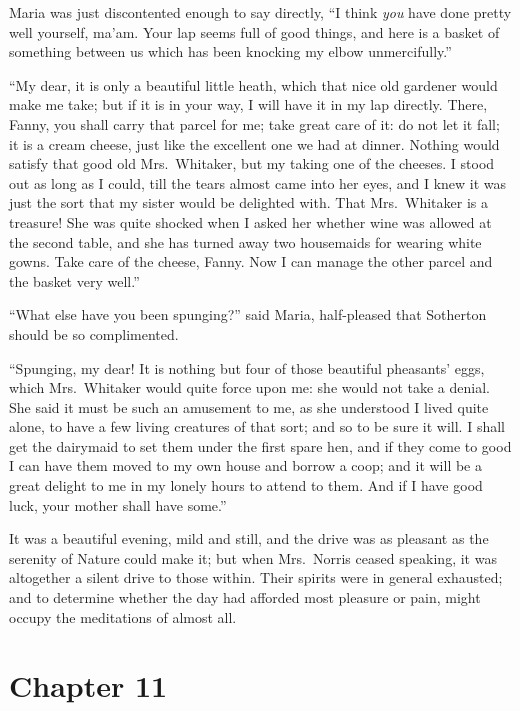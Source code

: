Maria was just discontented enough to say directly, ``I think
\emph{you} have done pretty well yourself, ma'am. Your lap seems
full of good things, and here is a basket of something
between us which has been knocking my elbow unmercifully.''

``My dear, it is only a beautiful little heath,
which that nice old gardener would make me take; but if
it is in your way, I will have it in my lap directly.
There, Fanny, you shall carry that parcel for me;
take great care of it:  do not let it fall; it is a
cream cheese, just like the excellent one we had at dinner.
Nothing would satisfy that good old Mrs.\ Whitaker,
but my taking one of the cheeses.  I stood out as long
as I could, till the tears almost came into her eyes,
and I knew it was just the sort that my sister would
be delighted with.  That Mrs.\ Whitaker is a treasure!
She was quite shocked when I asked her whether wine was allowed
at the second table, and she has turned away two housemaids
for wearing white gowns.  Take care of the cheese, Fanny.
Now I can manage the other parcel and the basket very well.''

``What else have you been spunging?'' said Maria,
half-pleased that Sotherton should be so complimented.

``Spunging, my dear!  It is nothing but four of those
beautiful pheasants' eggs, which Mrs.\ Whitaker would
quite force upon me:  she would not take a denial.
She said it must be such an amusement to me, as she
understood I lived quite alone, to have a few living
creatures of that sort; and so to be sure it will.
I shall get the dairymaid to set them under the first
spare hen, and if they come to good I can have them moved
to my own house and borrow a coop; and it will be a great
delight to me in my lonely hours to attend to them.
And if I have good luck, your mother shall have some.''

It was a beautiful evening, mild and still, and the
drive was as pleasant as the serenity of Nature
could make it; but when Mrs.\ Norris ceased speaking,
it was altogether a silent drive to those within.
Their spirits were in general exhausted; and to determine
whether the day had afforded most pleasure or pain,
might occupy the meditations of almost all.



\chapter{Chapter 11}

